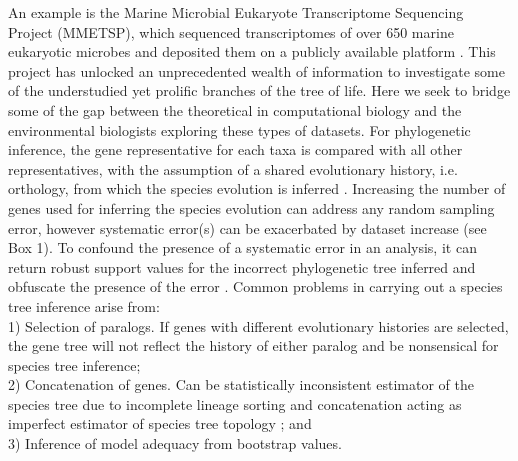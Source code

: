 \documentclass[12pt]{article}
\begin{document}
An example is the Marine Microbial Eukaryote Transcriptome
Sequencing Project (MMETSP), which sequenced transcriptomes of over 650 marine eukaryotic microbes and deposited them on a publicly available platform \cite{keeling2014marine}. 
This project has unlocked an unprecedented wealth of information to investigate some of the understudied yet prolific branches of the tree of life.
Here we seek to bridge some of the gap between the theoretical in computational biology and the environmental biologists exploring these types of datasets.
For phylogenetic inference, the gene representative for each taxa is compared with all other representatives, with the assumption of a shared evolutionary history, i.e. orthology, from which the species evolution is inferred \cite{maddison1997gene}. 
Increasing the number of genes used for inferring the species evolution can address any random sampling error, however systematic error(s) can be exacerbated by dataset increase (see Box 1). 
To confound the presence of a systematic error in an analysis, it can return robust support values for the incorrect phylogenetic tree inferred and obfuscate the presence of the error \cite{jeffroy2006phylogenomics,roch2015likelihood,kubatko2007inconsistency}. 
Common problems in carrying out a species tree inference arise from:\\
1) Selection of paralogs. 
If genes with different evolutionary histories are selected, the gene tree will not reflect the history of either paralog and be nonsensical for species tree inference; \\
2) Concatenation of genes. 
Can be statistically inconsistent estimator of the species tree due to incomplete lineage sorting and concatenation acting as imperfect estimator of species tree topology \cite{roch2015likelihood}; and \\
3) Inference of model adequacy from bootstrap values. 
\end{document}
